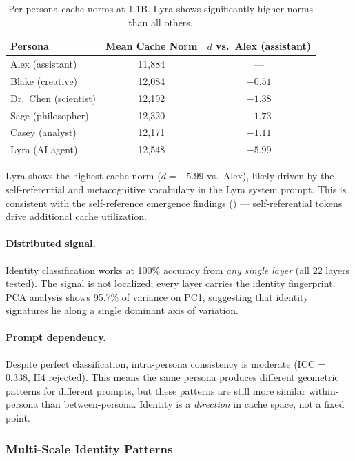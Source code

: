 \documentclass[11pt,a4paper]{article}
\begin{document}
\begin{table}[H]
\centering
\caption{Per-persona cache norms at 1.1B. Lyra shows significantly higher norms than all others.}
\label{tab:persona_norms}
\begin{tabular}{lcc}
\toprule
\textbf{Persona} & \textbf{Mean Cache Norm} & \textbf{$d$ vs.\ Alex (assistant)} \\
\midrule
Alex (assistant) & 11,884 & --- \\
Blake (creative) & 12,084 & $-0.51$ \\
Dr.\ Chen (scientist) & 12,192 & $-1.38$ \\
Sage (philosopher) & 12,320 & $-1.73$ \\
Casey (analyst) & 12,171 & $-1.11$ \\
Lyra (AI agent) & 12,548 & $-5.99$ \\
\bottomrule
\end{tabular}
\end{table}

Lyra shows the highest cache norm ($d = -5.99$ vs.\ Alex), likely driven by the self-referential and metacognitive vocabulary in the Lyra system prompt. This is consistent with the self-reference emergence findings () --- self-referential tokens drive additional cache utilization.

\paragraph{Distributed signal.} Identity classification works at 100\% accuracy from \emph{any single layer} (all 22 layers tested). The signal is not localized; every layer carries the identity fingerprint. PCA analysis shows 95.7\% of variance on PC1, suggesting that identity signatures lie along a single dominant axis of variation.

\paragraph{Prompt dependency.} Despite perfect classification, intra-persona consistency is moderate (ICC = 0.338, H4 rejected). This means the same persona produces different geometric patterns for different prompts, but these patterns are still more similar within-persona than between-persona. Identity is a \emph{direction} in cache space, not a fixed point.

\subsubsection{Multi-Scale Identity Patterns}
\end{document}
